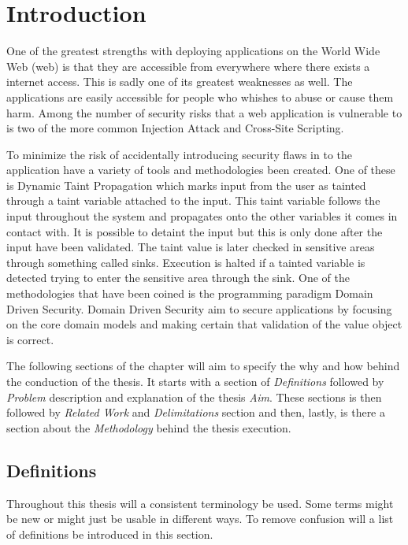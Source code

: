 \chapter{Introduction}
One of the greatest strengths with deploying applications on the World Wide Web (web) is that they are accessible from everywhere where there exists a internet access. This is sadly one of its greatest weaknesses as well. The applications are easily accessible for people who whishes to abuse or cause them harm. Among the number of security risks that a web application is vulnerable to is two of the more common Injection Attack and Cross-Site Scripting. \parencite{OpenWebApplicationSecurityProject, CrossMichael2007Dgtw}

To minimize the risk of accidentally introducing security flaws in to the application have a variety of tools and methodologies been created. One of these is Dynamic Taint Propagation which marks input from the user as tainted through a taint variable attached to the input. This taint variable follows the input throughout the system and propagates onto the other variables it comes in contact with. It is possible to detaint the input but this is only done after the input have been validated. The taint value is later checked in sensitive areas through something called sinks. Execution is halted if a tainted variable is detected trying to enter the sensitive area through the sink. \parencite{Pan2015, Venkataramani2008} One of the methodologies that have been coined is the programming paradigm Domain Driven Security. Domain Driven Security aim to secure applications by focusing on the core domain models and making certain that validation of the value object is correct. \parencite{Wilander2009, Johnsson2009}

The following sections of the chapter will aim to specify the why and how behind the conduction of the thesis. It starts with a section of \textit{Definitions} followed by \textit{Problem} description and explanation of the thesis \textit{Aim}. These sections is then followed by \textit{Related Work} and \textit{Delimitations} section and then, lastly, is there a section about the \textit{Methodology} behind the thesis execution.


\section{Definitions}
Throughout this thesis will a consistent terminology be used. Some terms might be new or might just be usable in different ways. To remove confusion will a list of definitions be introduced in this section.

